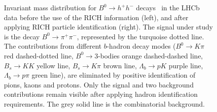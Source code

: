 \begin{figure}[h]
\caption{\label{fig:PID} Invariant mass distribution for $B^0\to h^+ h^-$ decays~\cite{LHCb-PAPER-2012-002} in
  the LHCb data before the use of the RICH information (left), and after
  applying RICH particle identification (right). The signal under study is the
  decay $B^0\to\pi^+\pi^-$, represented by the turquoise dotted line. The
  contributions from different $b$-hadron decay modes ($B^0\to K\pi$ red dashed-dotted
  line, $B^0\to 3$-bodies orange dashed-dashed line, $B_s\to
    KK$ yellow line, $B_s\to K\pi$
  brown line, $\Lambda_b\to p K$ purple line, $\Lambda_b\to p \pi$ green line), are eliminated by
  positive identification of pions, kaons and protons. Only the signal and
  two background contributions remain visible after applying hadron
  identification requirements. The
  grey solid line is the combinatorial background.}
\end{figure}

